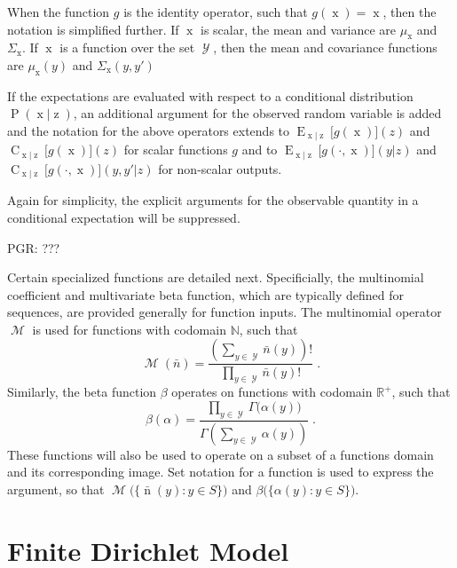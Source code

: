 \documentclass[12pt]{report}
\DeclareMathOperator{\xrm}{\mathrm{x}}
\DeclareMathOperator{\nrm}{\mathrm{n}}
\DeclareMathOperator{\zrm}{\mathrm{z}}
\DeclareMathOperator{\Prm}{\mathrm{P}}
\DeclareMathOperator{\Erm}{\mathrm{E}}
\DeclareMathOperator{\Crm}{\mathrm{C}}
\DeclareMathOperator{\Ycal}{\mathcal{Y}}
\DeclareMathOperator{\Mcal}{\mathcal{M}}
\begin{document}
When the function $g$ is the identity operator, such that $g(\xrm) = \xrm$, then the notation is simplified further. If $\xrm$ is scalar, the mean and variance are $\mu_{\xrm}$ and $\Sigma_{\xrm}$. If $\xrm$ is a function over the set $\Ycal$, then the mean and covariance functions are $\mu_{\xrm}(y)$ and $\Sigma_{\xrm}(y,y')$

If the expectations are evaluated with respect to a conditional distribution $\Prm(\xrm|\zrm)$, an additional argument for the observed random variable is added and the notation for the above operators extends to $\Erm_{\xrm|\zrm}\big[ g(\xrm) \big](z)$ and $\Crm_{\xrm|\zrm}\big[g(\xrm)\big](z)$ for scalar functions $g$ and to $\Erm_{\xrm|\zrm}\big[ g(\cdot,\xrm) \big](y|z)$ and $\Crm_{\xrm|\zrm}\big[g(\cdot,\xrm)\big](y,y'|z)$ for non-scalar outputs.

Again for simplicity, the explicit arguments for the observable quantity in a conditional expectation will be suppressed. 

PGR: ???

Certain specialized functions are detailed next. Specificially, the multinomial coefficient and multivariate beta function, which are typically defined for sequences, are provided generally for function inputs. The multinomial operator $\Mcal$ is used for functions with codomain $\mathbb{N}$, such that 
\begin{equation}
\Mcal(\bar{n}) = \frac{\left( \sum_{y \in \Ycal} \bar{n}(y) \right)!}{\prod_{y \in \Ycal} \bar{n}(y)!} \;.
\end{equation}
Similarly, the beta function $\beta$ operates on functions with codomain $\mathbb{R}^+$, such that
\begin{equation}
\beta(\alpha) = \frac{\prod_{y \in \Ycal} \Gamma\big( \alpha(y) \big)}{\Gamma \left( \sum_{y \in \Ycal} \alpha(y) \right)} \;.
\end{equation}
These functions will also be used to operate on a subset of a functions domain and its corresponding image. Set notation for a function is used to express the argument, so that $\Mcal\Big( \big\{ \bar{\nrm}(y) : y \in S \big\} \Big)$ and $\beta\Big( \big\{ \alpha(y) : y \in S \big\} \Big)$.













\chapter{Finite Dirichlet Model}
\end{document}
